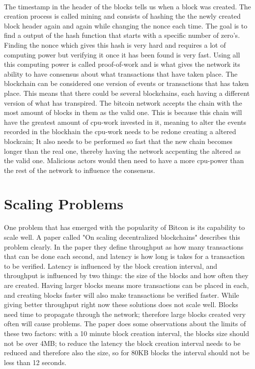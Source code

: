 \documentclass[informationsecurity]{gucmasterproject}
\begin{document}
\paragraph{}
The timestamp in the header of the blocks tells us when a block was created. The creation process is called mining and consists of hashing the the newly created block header again and again while changing the nonce each time. The goal is to find a output of the hash function that starts with a specific number of zero's. Finding the nonce which gives this hash is very hard and requires a lot of computing power but verifying it once it has been found is very fast. Using all this computing power is called proof-of-work and is what gives the network its ability to have consensus about what transactions that have taken place. The blockchain can be considered one version of events or transactions that has taken place. This means that there could be several blockchains, each having a different version of what has transpired. The bitcoin network accepts the chain with the most amount of blocks in them as the valid one. This is because this chain will have the greatest amount of cpu-work invested in it, meaning to alter the events recorded in the blockhain the cpu-work needs to be redone creating a altered blockcain; It also needs to be performed so fast that the new chain becomes longer than the real one, thereby having the network accpenting the altered as the valid one.
Malicious actors would then need to have a more cpu-power than the rest of the network to influence the consensus.



\section{Scaling Problems}

One problem that has emerged with the popularity of Bitcon is its capability to scale well.
A paper called "On scaling decentralized blockchains"\cite{croman2016scaling} describes this problem clearly.
In the paper they define throughput as how many transactions that can be done each second, and latency is how long is takes for a transaction to be verified. Latency is influenced by the block creation interval, and throughput is influenced by two things: the size of the blocks and how often they are created. Having larger blocks means more transactions can be placed in each, and creating blocks faster will also make transactions be verified faster. While giving better throughput right now these solutions does not scale well. Blocks need time to propagate through the network; therefore large blocks created very often will cause problems. The paper does some observations about the limits of these two factors: with a 10 minute block creation interval, the blocks size should not be over 4MB; to reduce the latency the block creation interval needs to be reduced and therefore also the size, so for 80KB blocks the interval should not be less than 12 seconds.
\end{document}
